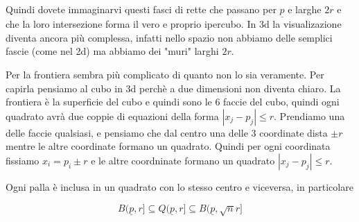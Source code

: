 \documentclass{rapport}
\begin{document}
\vspace{0.3cm}
Quindi dovete immaginarvi questi fasci di rette che passano per $\underline{p}$ e larghe $2r$ e che la loro intersezione forma il vero e proprio ipercubo. In 3d la visualizazione diventa ancora più complessa, infatti nello spazio non abbiamo delle semplici fascie (come nel 2d) ma abbiamo dei "muri" larghi $2r$.

Per la frontiera sembra più complicato di quanto non lo sia veramente. Per capirla pensiamo al cubo in 3d perchè a due dimensioni non diventa chiaro. La frontiera è la superficie del cubo e quindi sono le 6 faccie del cubo, quindi ogni quadrato avrà due coppie di equazioni della forma $|x_j-p_j|\leq r$. Prendiamo una delle faccie qualsiasi, e pensiamo che dal centro una delle 3 coordinate dista $\pm r$ mentre le altre coordinate formano un quadrato. Quindi per ogni coordinata fissiamo $x_i=p_i\pm r$ e le altre coordninate formano un quadrato $|x_j - p_j|\leq r$. 



\begin{teorema}{}{}
  Ogni palla è inclusa in un quadrato con lo stesso centro e viceversa, in particolare 

\[
  B(\underline{p}, r] \subseteq Q(\underline{p}, r] \subseteq B(\underline{p}, \sqrt{n}r]
\]

\end{teorema}
\end{document}
